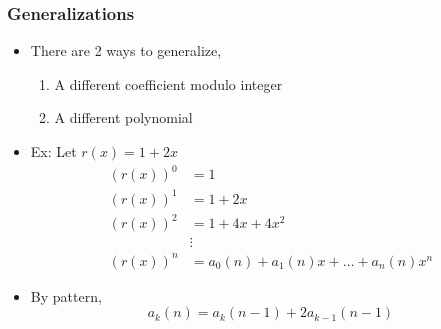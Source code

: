 \documentclass{beamer}
\begin{document}
\begin{frame}
    \frametitle{Generalizations}
    \begin{itemize}
        \item There are 2 ways to generalize,
        \begin{enumerate}
            \item A different coefficient modulo integer 
            \item A different polynomial
        \end{enumerate}
        \item Ex: Let $r(x) = 1+2x$
        \begin{align*}
            (r(x))^0 &= 1 \\
            (r(x))^1 &= 1+2x \\
            (r(x))^2 &= 1 + 4x + 4x^2\\
            &\vdots \\
            (r(x))^n &= a_0(n) + a_1(n)x + \dots + a_n(n)x^n
        \end{align*}
        \item By pattern,
        \begin{equation*}
            a_k(n) = a_{k}(n-1) + 2a_{k-1}(n-1)
        \end{equation*}
    \end{itemize}
\end{frame}
\end{document}
